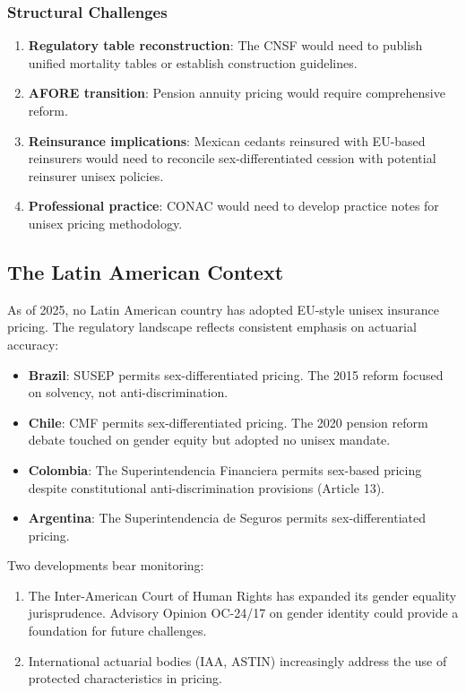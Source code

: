 \documentclass[12pt,a4paper]{article}
\begin{document}
\subsubsection{Structural Challenges}

\begin{enumerate}
  \item \textbf{Regulatory table reconstruction}: The CNSF would need to publish unified mortality tables or establish construction guidelines.
  \item \textbf{AFORE transition}: Pension annuity pricing would require comprehensive reform.
  \item \textbf{Reinsurance implications}: Mexican cedants reinsured with EU-based reinsurers would need to reconcile sex-differentiated cession with potential reinsurer unisex policies.
  \item \textbf{Professional practice}: CONAC would need to develop practice notes for unisex pricing methodology.
\end{enumerate}

\subsection{The Latin American Context}
\label{subsec:latam}

As of 2025, no Latin American country has adopted EU-style unisex insurance pricing. The regulatory landscape reflects consistent emphasis on actuarial accuracy:

\begin{itemize}
  \item \textbf{Brazil}: SUSEP permits sex-differentiated pricing. The 2015 reform focused on solvency, not anti-discrimination.
  \item \textbf{Chile}: CMF permits sex-differentiated pricing. The 2020 pension reform debate touched on gender equity but adopted no unisex mandate.
  \item \textbf{Colombia}: The Superintendencia Financiera permits sex-based pricing despite constitutional anti-discrimination provisions (Article 13).
  \item \textbf{Argentina}: The Superintendencia de Seguros permits sex-differentiated pricing.
\end{itemize}

Two developments bear monitoring:
\begin{enumerate}
  \item The Inter-American Court of Human Rights has expanded its gender equality jurisprudence. Advisory Opinion OC-24/17 on gender identity could provide a foundation for future challenges.
  \item International actuarial bodies (IAA, ASTIN) increasingly address the use of protected characteristics in pricing.
\end{enumerate}
\end{document}
